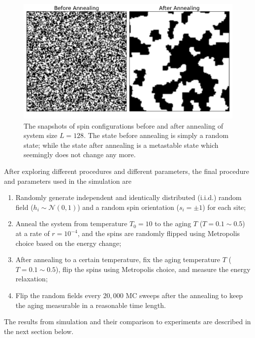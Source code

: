 \begin{figure}
\centering \includegraphics[width=0.9\columnwidth]{Chapter-4/RFIM_Before_After_Annealing}
\protect\caption{The snapshots of spin configurations before and after annealing of system size $L=128$. The state before annealing is simply a random state; while the state after annealing is a metastable state which seemingly does not change any more.}
\label{fig:rfim-baaneal} 
\end{figure}


After exploring different procedures and different parameters, the final procedure and parameters used in the simulation are
\begin{enumerate}
\item Randomly generate independent and identically distributed (i.i.d.) random field ($h_i\sim  \mathcal{N}(0, 1)$) and a random spin orientation ($s_i=\pm1$) for each site;
\item Anneal the system from temperature $T_0=10$ to the aging $T$ ($T=0.1\sim 0.5$) at a rate of $r=10^{-4}$, and the spins are randomly flipped using Metropolis choice based on the energy change;
\item After annealing to a certain temperature, fix the aging temperature $T$  ($T=0.1\sim 0.5$), flip the spins using Metropolis choice, and measure the energy relaxation;
\item Flip the random fields every $20,000$ MC sweeps after the annealing to keep the aging measurable in a reasonable time length.
\end{enumerate}

The results from simulation and their comparison to experiments are described in the next section below.



